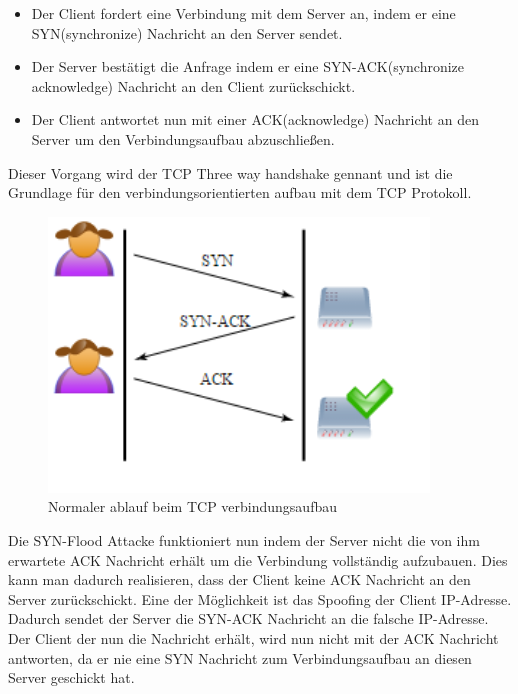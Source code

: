 \begin{itemize}
	\item Der Client fordert eine Verbindung mit dem Server an, indem er eine SYN(synchronize) Nachricht an den Server sendet.
	\item Der Server bestätigt die Anfrage indem er eine SYN-ACK(synchronize acknowledge) Nachricht an den Client zurückschickt. 
	\item Der Client antwortet nun mit einer ACK(acknowledge) Nachricht an den Server um den Verbindungsaufbau abzuschließen.
\end{itemize}
Dieser Vorgang wird der TCP Three way handshake gennant und ist die Grundlage für den verbindungsorientierten aufbau mit dem TCP Protokoll.
	\begin{figure}[H]
		\centering
		\includegraphics[width=0.9\textwidth]{images/DOS/three_way_handshake.png}
		\caption{Normaler ablauf beim TCP verbindungsaufbau}
		\label{fig:three way handshake}
	\end{figure}

Die SYN-Flood Attacke funktioniert nun indem der Server nicht die von ihm erwartete ACK Nachricht erhält um die Verbindung vollständig aufzubauen.
Dies kann man dadurch realisieren, dass der Client keine ACK Nachricht an den Server zurückschickt. Eine der Möglichkeit ist das Spoofing der Client IP-Adresse. Dadurch sendet der Server die SYN-ACK Nachricht an die falsche IP-Adresse. Der Client der nun die Nachricht erhält, wird nun nicht mit der ACK Nachricht antworten, da er nie eine SYN Nachricht zum Verbindungsaufbau an diesen Server geschickt hat.

